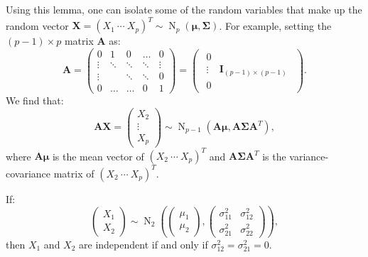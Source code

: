 \documentclass{huhtakm-template-book-v2}
\DeclareMathOperator{\N}{N}
\begin{document}
    \begin{eg}
        Using this lemma, one can isolate some of the random variables that make up the random vector $\mathbf{X} = (X_{1}\ \cdots\ X_{p})^{T} \sim \N_{p}(\boldsymbol{\mu}, \mathbf{\Sigma})$. For example, setting the $(p-1) \times p$ matrix $\mathbf{A}$ as:
        \begin{equation*}
            \mathbf{A} = \begin{pmatrix}
                0 & 1 & 0 & \hdots & 0\\
                \vdots & \ddots & \ddots & \ddots & \vdots\\
                \vdots & & \ddots & \ddots & 0\\
                0 & \hdots & \hdots & 0 & 1
            \end{pmatrix} = \begin{pmatrix}\begin{array}{c|c}
                0 & \\
                \vdots & \mathbf{I}_{(p-1) \times (p-1)}\\
                0 &
            \end{array}\end{pmatrix}.
        \end{equation*}
        We find that:
        \begin{equation*}
            \mathbf{AX} = \begin{pmatrix}
            X_{2}\\
            \vdots\\
            X_{p}
            \end{pmatrix} \sim \N_{p-1}(\mathbf{A} \boldsymbol{\mu}, \mathbf{A\Sigma A}^{T}),
        \end{equation*}
        where $\mathbf{A} \boldsymbol{\mu}$ is the mean vector of $(X_{2}\ \cdots\ X_{p})^{T}$ and $\mathbf{A\Sigma A}^{T}$ is the variance-covariance matrix of $(X_{2}\ \cdots\ X_{p})^{T}$.
    \end{eg}
    \begin{lem}
        \label{Chapter 1 (Lemma) Independence iff uncorrelated and bivariate}
        If:
        \begin{equation*}
            \begin{pmatrix}X_{1}\\X_{2}\end{pmatrix} \sim \N_{2}\left(\begin{pmatrix}\mu_{1}\\\mu_{2}\end{pmatrix}, \begin{pmatrix}\sigma_{11}^{2} & \sigma_{12}^{2}\\\sigma_{21}^{2} & \sigma_{22}^{2}\end{pmatrix}\right),
        \end{equation*}
        then $X_{1}$ and $X_{2}$ are independent if and only if $\sigma_{12}^{2} = \sigma_{21}^{2} = 0$.
    \end{lem}
\end{document}

